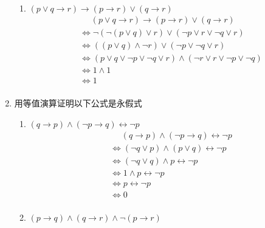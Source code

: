 \documentclass[UTF8]{ctexart}
\begin{document}
\begin{enumerate}
\begin{enumerate}
        
        \item  $( p \vee  q \rightarrow  r) \rightarrow  ( p \rightarrow  r) \vee  (q \rightarrow  r)$
        \[
            \begin{aligned}
                &\mathrel{\phantom{=}} (p\vee q \rightarrow r)\rightarrow (p\rightarrow r)\vee(q\rightarrow r)\\
                &\Leftrightarrow \neg(\neg (p\vee q)\vee r)\vee(\neg p \vee r \vee \neg q \vee r)\\
                &\Leftrightarrow ((p\vee q)\wedge \neg r) \vee (\neg p \vee \neg q \vee r)\\
                &\Leftrightarrow (p\vee q \vee \neg p \vee \neg q \vee r)\wedge(\neg r \vee r \vee \neg p \vee \neg q)\\
                &\Leftrightarrow 1\wedge 1\\
                &\Leftrightarrow 1\\
            \end{aligned}
        \]
    \end{enumerate}
    \item 用等值演算证明以下公式是永假式
    \begin{enumerate}
        \item $(q \rightarrow p) \wedge  (\neg p \rightarrow q) \leftrightarrow \neg p$
        \[
            \begin{aligned}
                &\mathrel{\phantom{=}}(q \rightarrow p) \wedge  (\neg p \rightarrow q) \leftrightarrow \neg p\\
                &\Leftrightarrow (\neg q \vee p)\wedge (p \vee q)\leftrightarrow \neg p\\
                &\Leftrightarrow (\neg q \vee q )\wedge p \leftrightarrow \neg p\\
                &\Leftrightarrow 1\wedge p \leftrightarrow \neg p\\
                &\Leftrightarrow p\leftrightarrow \neg p\\
                &\Leftrightarrow 0\\
            \end{aligned}
        \]
 

        \item $ ( p \rightarrow q) \wedge  (q \rightarrow r) \wedge  \neg ( p \rightarrow r)$
        
        
    \end{enumerate}
    \end{enumerate}
\end{document}
